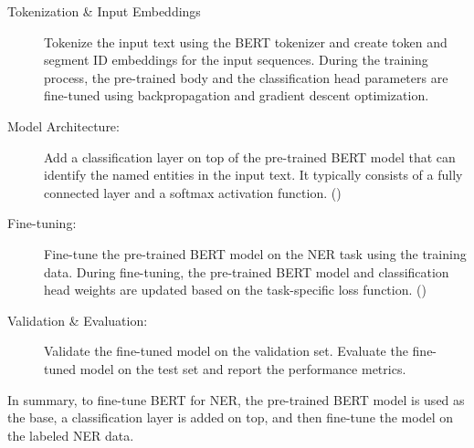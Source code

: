 \begin{description}
   \item[Tokenization \& Input Embeddings] Tokenize the input text using the BERT tokenizer and create token and segment ID embeddings for the input sequences. During the training process, the pre-trained body and the classification head parameters are fine-tuned using backpropagation and gradient descent optimization. \cite{merchant_what_2020}
   
   \item[Model Architecture:] Add a classification layer on top of the pre-trained BERT model that can identify the named entities in the input text. It typically consists of a fully connected layer and a softmax activation function. (\cite{tunstall_natural_2022})
   
   \item[Fine-tuning:] Fine-tune the pre-trained BERT model on the NER task using the training data. During fine-tuning, the pre-trained BERT model and classification head weights are updated based on the task-specific loss function. (\cite{devlin_bert_2019})
   
   \item[Validation \& Evaluation:] Validate the fine-tuned model on the validation set. Evaluate the fine-tuned model on the test set and report the performance metrics.
   
\end{description}

In summary, to fine-tune BERT for NER, the pre-trained BERT model is used as the base, a classification layer is added on top, and then fine-tune the model on the labeled NER data.